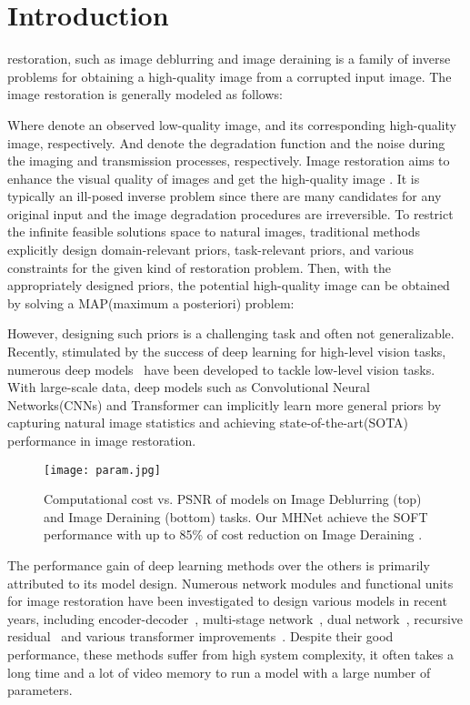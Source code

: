 \documentclass[lettersize,journal]{IEEEtran}
\begin{document}
\section{Introduction}
 restoration, such as image deblurring and image deraining is a family of inverse problems for obtaining a high-quality image from a corrupted input image. The image restoration is generally modeled as follows: 


Where  denote an observed low-quality image, and its corresponding high-quality image, respectively. And  denote the degradation function and the noise during the imaging and transmission processes, respectively.  Image restoration aims to enhance the visual quality of images  and get the high-quality image . It is typically an ill-posed inverse problem since there are many candidates for any original input and the image degradation procedures are irreversible. To restrict the infinite feasible solutions space to natural images, traditional methods~\cite{1992Nonlinear,  2002Scale, 2005Fields, 2011Image, 2011Single} explicitly design domain-relevant priors, task-relevant priors, and various constraints for the given kind of restoration problem. Then, with the appropriately designed priors, the potential high-quality image  can be obtained by solving a MAP(maximum a posteriori) problem:


However, designing such priors is a challenging task and often not generalizable.  Recently, stimulated by the success of deep learning for high-level vision tasks, numerous deep models~\cite{dai2019second,2020Residual,Zamir2021MPRNet,Zamir2022MIRNetv2,chen2022simple,chu2022nafssr,Wang_2022_CVPR,Chen_2021_CVPR} have been developed to tackle low-level vision tasks. With large-scale data, deep models such as Convolutional Neural Networks(CNNs) and Transformer can implicitly learn more general priors by capturing natural image statistics and achieving state-of-the-art(SOTA) performance in image restoration.
\begin{figure}[t] \centering
	\texttt{[image: param.jpg]}
	\caption{Computational cost vs. PSNR of models on Image Deblurring (top) and Image Deraining (bottom) tasks. Our MHNet achieve the SOFT performance with up to 85\% of cost reduction on Image Deraining .}
	\label{fig:param}
\end{figure}


The performance gain of deep learning methods over the others is primarily attributed to its model design. Numerous network modules and functional units for image restoration have been investigated to design various models in recent years, including encoder-decoder~\cite{chen2022simple,chu2022nafssr}, multi-stage network~\cite{Zamir2021MPRNet, Chen_2021_CVPR,PREnet,RESCAN}, dual network~\cite{2018LearningD, 2022Learning,2020Refining,chen2020decomposition}, recursive residual~\cite{zhang2018image,2019Real} and various transformer improvements~\cite{zhang2023accurate, Zamir2021Restormer, Tsai2022Stripformer,Wang_2022_CVPR}. Despite their good performance, these methods suffer from high system complexity, it often takes a long time and a lot of video memory to run a model with a large number of parameters. 
\end{document}
